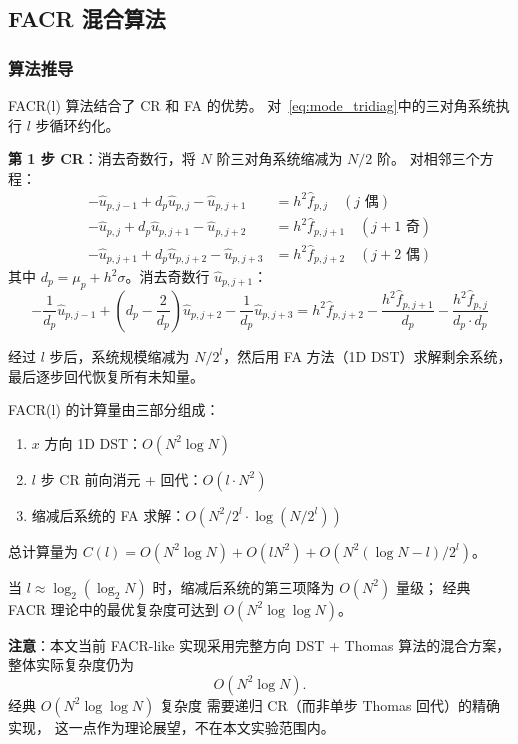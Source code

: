 \subsection{FACR 混合算法}

\subsubsection{算法推导}

FACR(l) 算法结合了 CR 和 FA 的优势。
对~\eqref{eq:mode_tridiag}中的三对角系统执行 $l$ 步循环约化。

\textbf{第 1 步 CR}：消去奇数行，将 $N$ 阶三对角系统缩减为 $N/2$ 阶。
对相邻三个方程：
\begin{align}
  -\hat{u}_{p,j-1} + d_p \hat{u}_{p,j} - \hat{u}_{p,j+1} &= h^2 \hat{f}_{p,j} \quad (j \text{ 偶}) \\
  -\hat{u}_{p,j} + d_p \hat{u}_{p,j+1} - \hat{u}_{p,j+2} &= h^2 \hat{f}_{p,j+1} \quad (j+1 \text{ 奇}) \\
  -\hat{u}_{p,j+1} + d_p \hat{u}_{p,j+2} - \hat{u}_{p,j+3} &= h^2 \hat{f}_{p,j+2} \quad (j+2 \text{ 偶})
\end{align}
其中 $d_p = \mu_p + h^2 \sigma$。消去奇数行 $\hat{u}_{p,j+1}$：
\begin{equation}
  -\frac{1}{d_p}\hat{u}_{p,j-1} + \left(d_p - \frac{2}{d_p}\right)\hat{u}_{p,j+2} - \frac{1}{d_p}\hat{u}_{p,j+3}
  = h^2\hat{f}_{p,j+2} - \frac{h^2\hat{f}_{p,j+1}}{d_p} - \frac{h^2\hat{f}_{p,j}}{d_p \cdot d_p}
  \label{eq:cr_step}
\end{equation}

经过 $l$ 步后，系统规模缩减为 $N/2^l$，然后用 FA 方法（1D DST）求解剩余系统，
最后逐步回代恢复所有未知量。

\begin{theorem}
  \label{thm:facr_complexity}
  FACR(l) 的计算量由三部分组成：
  \begin{enumerate}[itemsep=1pt]
    \item $x$ 方向 1D DST：$O(N^2 \log N)$
    \item $l$ 步 CR 前向消元 + 回代：$O(l \cdot N^2)$
    \item 缩减后系统的 FA 求解：$O(N^2/2^l \cdot \log(N/2^l))$
  \end{enumerate}
  总计算量为 $C(l) = O(N^2 \log N) + O(l N^2) + O(N^2 (\log N - l)/2^l)$。

  当 $l \approx \log_2(\log_2 N)$ 时，缩减后系统的第三项降为 $O(N^2)$ 量级；
  经典 FACR 理论中的最优复杂度可达到 $O(N^2 \log\log N)$。

  \textbf{注意}：本文当前 FACR-like 实现采用完整方向 DST + Thomas 算法的混合方案，
  整体实际复杂度仍为
  \[
    O(N^2 \log N).
  \]
  经典 $O(N^2 \log\log N)$ 复杂度
  需要递归 CR（而非单步 Thomas 回代）的精确实现，
  这一点作为理论展望，不在本文实验范围内。
\end{theorem}

